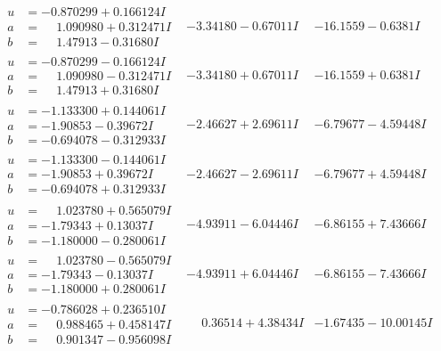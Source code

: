 \documentclass[1p]{elsarticle_modified}
\theoremstyle{definition}
\begin{document}
$$\begin{array}{c|c|c}
\begin{aligned}
u &= -0.870299 + 0.166124 I \\
a &= \phantom{-}1.090980 + 0.312471 I \\
b &= \phantom{-}1.47913 - 0.31680 I\end{aligned}
 & -3.34180 - 0.67011 I & -16.1559 - 0.6381 I \\ \hline\begin{aligned}
u &= -0.870299 - 0.166124 I \\
a &= \phantom{-}1.090980 - 0.312471 I \\
b &= \phantom{-}1.47913 + 0.31680 I\end{aligned}
 & -3.34180 + 0.67011 I & -16.1559 + 0.6381 I \\ \hline\begin{aligned}
u &= -1.133300 + 0.144061 I \\
a &= -1.90853 - 0.39672 I \\
b &= -0.694078 - 0.312933 I\end{aligned}
 & -2.46627 + 2.69611 I & -6.79677 - 4.59448 I \\ \hline\begin{aligned}
u &= -1.133300 - 0.144061 I \\
a &= -1.90853 + 0.39672 I \\
b &= -0.694078 + 0.312933 I\end{aligned}
 & -2.46627 - 2.69611 I & -6.79677 + 4.59448 I \\ \hline\begin{aligned}
u &= \phantom{-}1.023780 + 0.565079 I \\
a &= -1.79343 + 0.13037 I \\
b &= -1.180000 - 0.280061 I\end{aligned}
 & -4.93911 - 6.04446 I & -6.86155 + 7.43666 I \\ \hline\begin{aligned}
u &= \phantom{-}1.023780 - 0.565079 I \\
a &= -1.79343 - 0.13037 I \\
b &= -1.180000 + 0.280061 I\end{aligned}
 & -4.93911 + 6.04446 I & -6.86155 - 7.43666 I \\ \hline\begin{aligned}
u &= -0.786028 + 0.236510 I \\
a &= \phantom{-}0.988465 + 0.458147 I \\
b &= \phantom{-}0.901347 - 0.956098 I\end{aligned}
 & \phantom{-}0.36514 + 4.38434 I & -1.67435 - 10.00145 I \\ \hline\begin{aligned}

\end{aligned}
\end{array}$$
\end{document}
